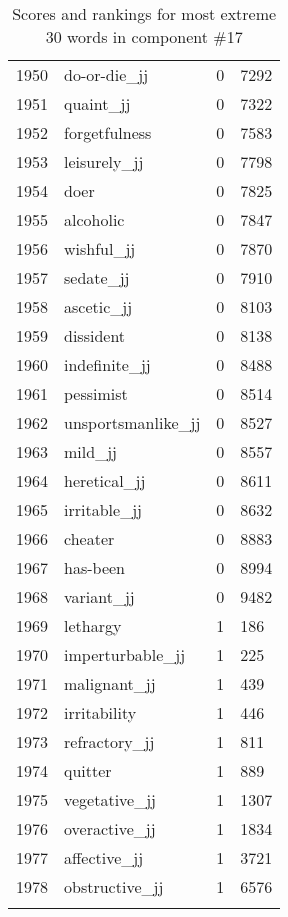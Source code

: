 \begin{longtable}[!htbp]{| rlr@{.}l |}
    1950 & do-or-die\_jj & 0 & 7292 \\
    1951 & quaint\_jj & 0 & 7322 \\
    1952 & forgetfulness & 0 & 7583 \\
    1953 & leisurely\_jj & 0 & 7798 \\
    1954 & doer & 0 & 7825 \\
    1955 & alcoholic & 0 & 7847 \\
    1956 & wishful\_jj & 0 & 7870 \\
    1957 & sedate\_jj & 0 & 7910 \\
    1958 & ascetic\_jj & 0 & 8103 \\
    1959 & dissident & 0 & 8138 \\
    1960 & indefinite\_jj & 0 & 8488 \\
    1961 & pessimist & 0 & 8514 \\
    1962 & unsportsmanlike\_jj & 0 & 8527 \\
    1963 & mild\_jj & 0 & 8557 \\
    1964 & heretical\_jj & 0 & 8611 \\
    1965 & irritable\_jj & 0 & 8632 \\
    1966 & cheater & 0 & 8883 \\
    1967 & has-been & 0 & 8994 \\
    1968 & variant\_jj & 0 & 9482 \\
    1969 & lethargy & 1 & 186 \\
    1970 & imperturbable\_jj & 1 & 225 \\
    1971 & malignant\_jj & 1 & 439 \\
    1972 & irritability & 1 & 446 \\
    1973 & refractory\_jj & 1 & 811 \\
    1974 & quitter & 1 & 889 \\
    1975 & vegetative\_jj & 1 & 1307 \\
    1976 & overactive\_jj & 1 & 1834 \\
    1977 & affective\_jj & 1 & 3721 \\
    1978 & obstructive\_jj & 1 & 6576 \\
    \hline
    \caption{Scores and rankings for most extreme 30 words in component \#17} \\
\end{longtable}

